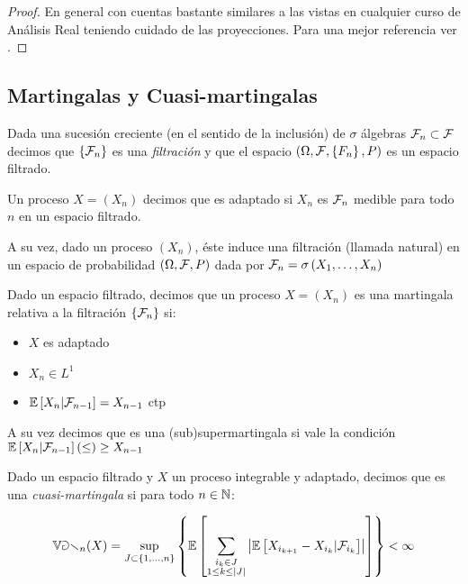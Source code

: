 \begin{proof}
	En general con cuentas bastante similares a las vistas en cualquier curso de An\'alisis Real teniendo cuidado de las proyecciones. Para una mejor referencia ver \cite{williams:1991}.
\end{proof}

\subsection{Martingalas y Cuasi-martingalas}

\begin{definition}
	Dada una sucesi\'on creciente (en el sentido de la inclusi\'on) de $\sigma$ \'algebras $\mathcal{F}_n \subset \mathcal{F}$ decimos que $\left\lbrace\mathcal{F}_n\right\rbrace$ es una \textit{filtraci\'on} y que el espacio $\left(\Omega, \mathcal{F}, \left\lbrace F_n\right\rbrace, P\right)$ es un espacio filtrado.
	
	Un proceso $X  = \left(X_n\right)$ decimos que es adaptado si $X_n $ es $\mathcal{F}_n$ medible para todo $n$ en un espacio filtrado.
	
	A su vez, dado un proceso $\left(X_n\right)$, \'este induce una filtraci\'on (llamada natural) en un espacio de probabilidad $\left(\Omega, \mathcal{F}, P\right)$ dada por $\mathcal{F}_n = \sigma\left(X_1, \dots, X_n \right)$
	
\end{definition}

\begin{definition}
	Dado un espacio filtrado, decimos que un proceso $X = \left(X_n\right)$ es una martingala relativa a la filtraci\'on $\left\lbrace\mathcal{F}_n\right\rbrace$ si:
	
	\begin{itemize}
		\item $X$ es adaptado
		\item $X_n \in L^1$
		\item $\mathbb{E} \left[X_n \vert \mathcal{F}_{n-1}\right] = X_{n-1}$ ctp
	\end{itemize}

	A su vez decimos que es una (sub)supermartingala si vale la condici\'on $\mathbb{E} \left[X_n \vert \mathcal{F}_{n-1}\right] (\leq)\geq X_{n-1}$
	
\end{definition}

\begin{definition}
	Dado un espacio filtrado y $X$ un proceso integrable y adaptado, decimos que es una \textit{cuasi-martingala} si para todo $n \in {\mathbb{N}}$:
	
	\begin{equation}
		\mathbb{Var}_n(X) = \sup\limits_{J \subset \left\lbrace1, \dots, n\right\rbrace} \left\lbrace\mathbb{E} \left[\sum\limits_{\substack{i_k \in J \\ 1 \leq k \leq \left\lvert J\right\rvert}}{\left\lvert\mathbb{E} \left[X_{i_{k+1}} - X_{i_k} \vert \mathcal{F}_{i_{k}}\right]\right\rvert}\right]\right\rbrace < \infty
	\end{equation}
	
\end{definition}

